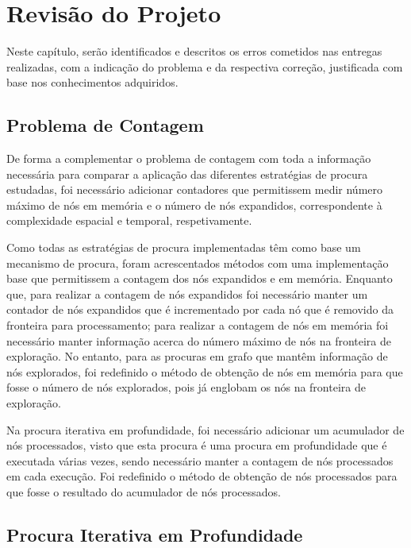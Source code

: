 \chapter{Revisão do Projeto}\label{ch:revisao-projeto}

Neste capítulo, serão identificados e descritos os erros cometidos nas entregas realizadas, com a indicação do problema e da respectiva correção, justificada com base nos conhecimentos adquiridos.

\section{Problema de Contagem}\label{sec:problema-de-contagem}

De forma a complementar o problema de contagem com toda a informação necessária para comparar a aplicação das diferentes estratégias de procura estudadas, foi necessário adicionar contadores que permitissem medir número máximo de nós em memória e o número de nós expandidos, correspondente à complexidade espacial e temporal, respetivamente.

Como todas as estratégias de procura implementadas têm como base um mecanismo de procura, foram acrescentados métodos com uma implementação base que permitissem a contagem dos nós expandidos e em memória.
Enquanto que, para realizar a contagem de nós expandidos foi necessário manter um contador de nós expandidos que é incrementado por cada nó que é removido da fronteira para processamento; para realizar a contagem de nós em memória foi necessário manter informação acerca do número máximo de nós na fronteira de exploração.
No entanto, para as procuras em grafo que mantêm informação de nós explorados, foi redefinido o método de obtenção de nós em memória para que fosse o número de nós explorados, pois já englobam os nós na fronteira de exploração.

Na procura iterativa em profundidade, foi necessário adicionar um acumulador de nós processados, visto que esta procura é uma procura em profundidade que é executada várias vezes, sendo necessário manter a contagem de nós processados em cada execução.
Foi redefinido o método de obtenção de nós processados para que fosse o resultado do acumulador de nós processados.

\section{Procura Iterativa em Profundidade}\label{sec:procura-iterativa-em-profundidade}

